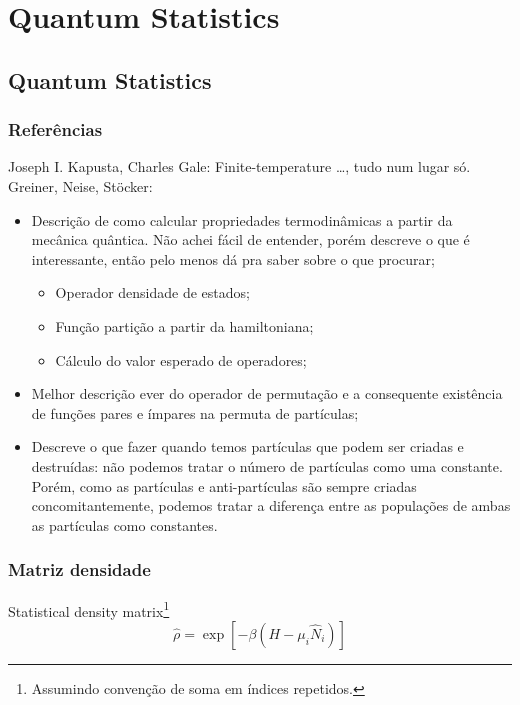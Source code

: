 \chapter{Quantum Statistics}

\section{Quantum Statistics}
\subsection{Referências}
Joseph I. Kapusta, Charles Gale: Finite-temperature \dots, tudo num lugar só.
Greiner, Neise, Stöcker:
\begin{itemize}
	\item Descrição de como calcular propriedades termodinâmicas a partir da mecânica quântica. Não achei fácil de entender, porém descreve o que é interessante, então pelo menos dá pra saber sobre o que procurar;
	\begin{itemize}
            \item Operador densidade de estados;
            \item Função partição a partir da hamiltoniana;
            \item Cálculo do valor esperado de operadores;
    \end{itemize}
    \item Melhor descrição ever do operador de permutação e a consequente existência de funções pares e ímpares na permuta de partículas;
    \item Descreve o que fazer quando temos partículas que podem ser criadas e destruídas: não podemos tratar o número de partículas como uma constante. Porém, como as partículas e anti-partículas são sempre criadas concomitantemente, podemos tratar a diferença entre as populações de ambas as partículas como constantes.
\end{itemize}

\subsection{Matriz densidade}

Statistical density matrix\footnote{Assumindo convenção de soma em índices repetidos.}
\begin{equation}
	\hat{\rho} = \exp\left[-\beta(H-\mu_i\hat{N}_i)\right]
\end{equation}

